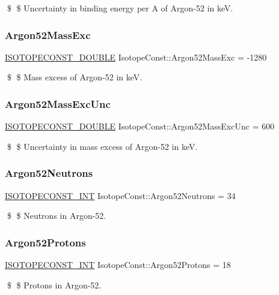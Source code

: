 \$ \$ Uncertainty in binding energy per A of Argon-\/52 in keV. \mbox{\label{group___isotope_const-_argon-_ar52_ga4c164902378f6cdd812f92b884c79bb8}} 
\subsubsection{\texorpdfstring{Argon52\+Mass\+Exc}{Argon52MassExc}}
{\footnotesize\ttfamily \mbox{\hyperlink{group___isotope_const-_macros_ga8f45a7272ce02c0b4c65c44636ed719a}{I\+S\+O\+T\+O\+P\+E\+C\+O\+N\+S\+T\+\_\+\+D\+O\+U\+B\+LE}} Isotope\+Const\+::\+Argon52\+Mass\+Exc = -\/1280}

\$ \$ Mass excess of Argon-\/52 in keV. \mbox{\label{group___isotope_const-_argon-_ar52_gad10983872f8d0378d98173b318ee1736}} 
\subsubsection{\texorpdfstring{Argon52\+Mass\+Exc\+Unc}{Argon52MassExcUnc}}
{\footnotesize\ttfamily \mbox{\hyperlink{group___isotope_const-_macros_ga8f45a7272ce02c0b4c65c44636ed719a}{I\+S\+O\+T\+O\+P\+E\+C\+O\+N\+S\+T\+\_\+\+D\+O\+U\+B\+LE}} Isotope\+Const\+::\+Argon52\+Mass\+Exc\+Unc = 600}

\$ \$ Uncertainty in mass excess of Argon-\/52 in keV. \mbox{\label{group___isotope_const-_argon-_ar52_ga9a656be8edc6b0b18e1e8b9d416d035c}} 
\subsubsection{\texorpdfstring{Argon52\+Neutrons}{Argon52Neutrons}}
{\footnotesize\ttfamily \mbox{\hyperlink{group___isotope_const-_macros_ga5f18360b3e99483a35c32d789e62621c}{I\+S\+O\+T\+O\+P\+E\+C\+O\+N\+S\+T\+\_\+\+I\+NT}} Isotope\+Const\+::\+Argon52\+Neutrons = 34}

\$ \$ Neutrons in Argon-\/52. \mbox{\label{group___isotope_const-_argon-_ar52_ga3906bab2cf43e47be803034f268e084c}} 
\subsubsection{\texorpdfstring{Argon52\+Protons}{Argon52Protons}}
{\footnotesize\ttfamily \mbox{\hyperlink{group___isotope_const-_macros_ga5f18360b3e99483a35c32d789e62621c}{I\+S\+O\+T\+O\+P\+E\+C\+O\+N\+S\+T\+\_\+\+I\+NT}} Isotope\+Const\+::\+Argon52\+Protons = 18}

\$ \$ Protons in Argon-\/52. 